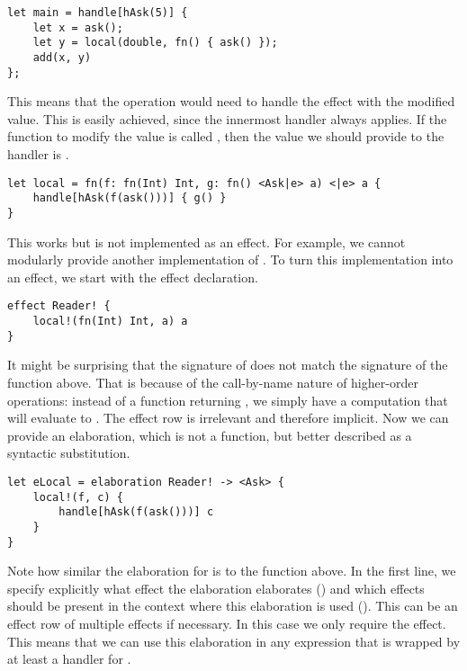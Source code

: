 \begin{lstlisting}[language=elaine,style=fancy]
let main = handle[hAsk(5)] {
    let x = ask();
    let y = local(double, fn() { ask() });
    add(x, y)
};
\end{lstlisting}

This means that the  operation would need to handle the  effect with the modified value. This is easily achieved, since the innermost handler always applies. If the function to modify the value is called , then the value we should provide to the handler is .

\begin{lstlisting}[language=elaine,style=fancy]
let local = fn(f: fn(Int) Int, g: fn() <Ask|e> a) <|e> a {
    handle[hAsk(f(ask()))] { g() }
}
\end{lstlisting}

This works but is not implemented as an effect. For example, we cannot modularly provide another implementation of . To turn this implementation into an effect, we start with the effect declaration.

\begin{lstlisting}[language=elaine,style=fancy]
effect Reader! {
    local!(fn(Int) Int, a) a
}
\end{lstlisting}

It might be surprising that the signature of  does not match the signature of the function above. That is because of the call-by-name nature of higher-order operations: instead of a function returning , we simply have a computation that will evaluate to . The effect row is irrelevant and therefore implicit. Now we can provide an elaboration, which is not a function, but better described as a syntactic substitution.

\begin{lstlisting}[language=elaine,style=fancy]
let eLocal = elaboration Reader! -> <Ask> {
    local!(f, c) {
        handle[hAsk(f(ask()))] c
    }
}
\end{lstlisting}

Note how similar the elaboration for  is to the  function above. In the first line, we specify explicitly what effect the elaboration elaborates () and which effects should be present in the context where this elaboration is used (). This can be an effect row of multiple effects if necessary. In this case we only require the  effect. This means that we can use this elaboration in any expression that is wrapped by at least a handler for .

